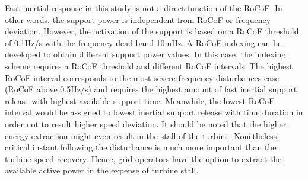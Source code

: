Fast inertial response in this study is not a direct function of the RoCoF. In other words, the support power is independent from RoCoF or frequency deviation. However, the activation of the support is based on a RoCoF threshold of 0.1Hz/s with the frequency dead-band 10mHz. A RoCoF indexing can be developed to obtain different support power values. In this case, the indexing scheme requires a RoCoF threshold and different RoCoF intervals. The highest RoCoF interval corresponds to the most severe frequency disturbances case (RoCoF above 0.5Hz/s) and requires the highest amount of fast inertial support release with highest available support time. Meanwhile, the lowest RoCoF interval would be assigned to lowest inertial support release with time duration in order not to result higher speed deviation. It should be noted that the higher energy extraction might even result in the stall of the turbine. Nonetheless, critical instant following the disturbance is much more important than the turbine speed recovery. Hence, grid operators have the option to extract the available active power in the expense of turbine stall.
